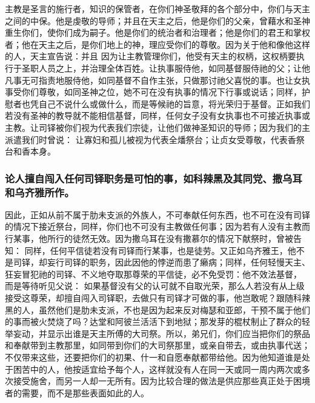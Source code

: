 主教是圣言的施行者，知识的保管者，在你们神圣敬拜的各个部分中，你们与天主之间的中保。他是虔敬的导师；并且在天主之后，他是你们的父亲，曾藉水和圣神重生你们，使你们成为嗣子。他是你们的统治者和治理者；他是你们的君王和掌权者；他在天主之后，是你们地上的神，理应受你们的尊敬。因为关于他和像他这样的人，天主宣告说：并且 因为让主教管理你们，他受有天主的权柄，这权柄要执行于圣职人员之上，并治理全体百姓。让执事服侍他，如同基督服侍祂的父；让他凡事无可指责地服侍他，如同基督不自作主张，只做那讨祂父喜悦的事。也让女执事受你们尊敬，如同圣神之位，她不可在没有执事的情况下行事或说话；同样，护慰者也凭自己不说什么或做什么，而是等候祂的旨意，将光荣归于基督。正如我们若没有圣神的教导就不能相信基督，同样，任何女子没有女执事也不可接近执事或主教。让司铎被你们视为代表我们宗徒，让他们做神圣知识的导师；因为我们的主派遣我们时曾说： 让寡妇和孤儿被视为代表全燔祭台；让贞女受尊敬，代表香祭台和香本身。\par


\subsubsection{论人擅自闯入任何司铎职务是可怕的事，如科辣黑及其同党、撒乌耳和乌齐雅所作。}

因此，正如从前不属于肋未支派的外族人，不可奉献任何东西，也不可在没有司铎的情况下接近祭台，同样，你们也不可没有主教做任何事；因为若有人没有主教而行某事，他所行的徒然无效。因为撒乌耳在没有撒慕尔的情况下献祭时，曾被告知： 同样，任何平信徒若没有司铎而行某事，也是徒劳。又正如乌齐雅王，他不是司铎，却妄行司铎的职务，因此因他的悖逆而患了癞病；同样，任何轻慢天主、狂妄冒犯祂的司铎、不义地夺取那尊荣的平信徒，必不免受罚：他不效法基督， 而是等待听见父说： 如果基督没有父的认可就不自取光荣，那么人若没有从上级接受这尊荣，却擅自闯入司铎职，去做只有司铎才可做的事，他岂敢呢？跟随科辣黑的人，虽然他们是肋未支派，不也是因为起来反对梅瑟和亚郎，干预不属于他们的事而被火焚烧了吗？达堂和阿彼兰活活下到地狱；那发芽的棍杖制止了群众的轻举妄动，并显示出谁是天主所傅的大司祭。所以，弟兄们，你们应当把你们的祭品和奉献带到主教那里，如同带到你们的大司祭那里，或亲自带去，或由执事代送；不仅带来这些，还要把你们的初果、什一和自愿奉献都带给他。因为他知道谁是处于困苦中的人，他按适宜给予每个人，这样就没有人在同一天或同一周内两次或多次接受施舍，而另一人却一无所有。因为比较合理的做法是供应那些真正处于困境者的需要，而不是那些表面如此的人。\par

